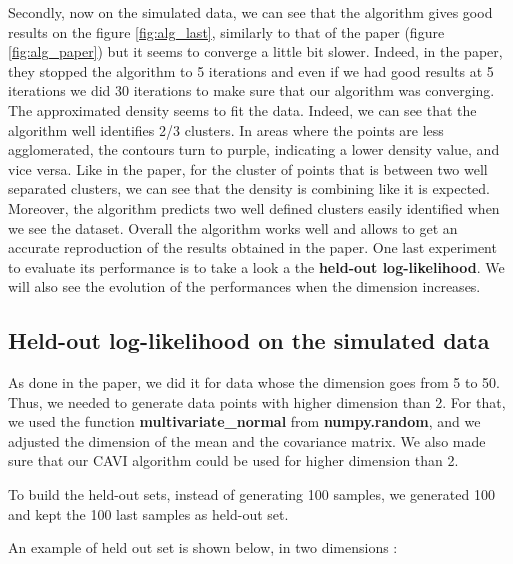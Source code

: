 \documentclass{article}
\begin{document}
Secondly, now on the simulated data, we can see that the algorithm gives good results on the figure \ref{fig:alg_last}, similarly to that of the paper (figure \ref{fig:alg_paper}) but it seems to converge a little bit slower. Indeed, in the paper, they stopped the algorithm to 5 iterations and even if we had good results at 5 iterations we did 30 iterations to make sure that our algorithm was converging.
The approximated density seems to fit the data. Indeed, we can see that the algorithm well identifies 2/3 clusters. In areas where the points are less agglomerated, the contours turn to purple, indicating a lower density value, and vice versa. Like in the paper, for the cluster of points that is between two well separated clusters, we can see that the density is combining like it is expected. Moreover, the algorithm predicts two well defined clusters easily identified when we see the dataset. Overall the algorithm works well and allows to get an accurate reproduction of the results obtained in the paper. One last experiment to evaluate its performance is to take a look a the \textbf{held-out log-likelihood}. We will also see the evolution of the performances when the dimension increases. 

\subsection{Held-out log-likelihood on the simulated data}

As done in the paper, we did it for data whose the dimension goes from 5 to 50. Thus, we needed to generate data points with higher dimension than 2. For that, we used the function \textbf{multivariate\_normal} from \textbf{numpy.random}, and we adjusted the dimension of the mean and the covariance matrix. We also made sure that our CAVI algorithm could be used for higher dimension than 2.

To build the held-out sets, instead of generating 100 samples, we generated 100 and kept the 100 last samples as held-out set.

An example of held out set is shown below, in two dimensions :
\end{document}
